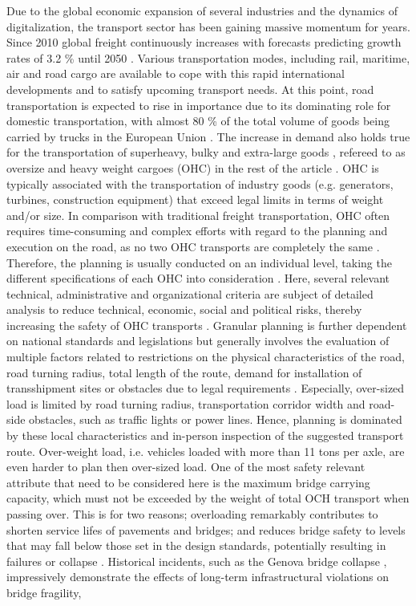 
Due to the global economic expansion of several industries and the dynamics of digitalization, the transport sector has been gaining massive momentum for years. Since 2010 global freight continuously increases with forecasts predicting growth rates of 3.2 \% until 2050 \cite{figura2020preferences, InternationalTransportForum}. Various transportation modes, including rail, maritime, air and road cargo are available to cope with this rapid international developments and to satisfy upcoming transport needs. At this point, road transportation is expected to rise in importance due to its dominating role for domestic transportation, with almost 80 \% of the total volume of goods being carried by trucks in the European Union \cite{Eurostat}. The increase in demand also holds true for the transportation of superheavy, bulky and extra-large goods \cite{gavrilova2021analysis}, refereed to as oversize and heavy weight cargoes (OHC) in the rest of the article \cite{Luo.2021}. OHC is typically associated with the transportation of industry goods (e.g. generators, turbines, construction equipment) that exceed legal limits in terms of weight and/or size. In comparison with traditional freight transportation, OHC often requires time-consuming and complex efforts with regard to the planning and execution on the road, as no two OHC transports are completely the same \cite{Wolnowska.2019}. Therefore, the planning is usually conducted on an individual level, taking the different specifications of each OHC into consideration \cite{Bazaras.2013}. Here, several relevant technical, administrative and organizational criteria are subject of detailed analysis to reduce technical, economic, social and political risks, thereby increasing the safety of OHC transports \cite{Palsaitis.2012}. Granular planning is further dependent on national standards and legislations but generally involves the evaluation of multiple factors related to restrictions on the physical characteristics of the road, road turning radius, total length of the route, demand for installation of transshipment sites or obstacles due to legal requirements \cite{PETRASKA.2018}. Especially, over-sized load is limited by road turning radius, transportation corridor width and road-side obstacles, such as traffic lights or power lines. Hence, planning is dominated by these local characteristics and in-person inspection of the suggested transport route. Over-weight load, i.e. vehicles loaded with more than 11 tons per axle, are even harder to plan then over-sized load. One of the most safety relevant attribute that need to be considered here is the maximum bridge carrying capacity, which must not be exceeded by the weight of total OCH transport when passing over. This is for two reasons; overloading remarkably contributes to shorten service lifes of pavements and bridges; and reduces bridge safety to levels that may fall below those set in the design standards, potentially resulting in failures or collapse \cite{fiorillo2018fragility}. Historical incidents, such as the Genova bridge collapse \cite{Morgese.2020, MorandiNYTimes}, impressively demonstrate the effects of long-term infrastructural violations on bridge fragility, 